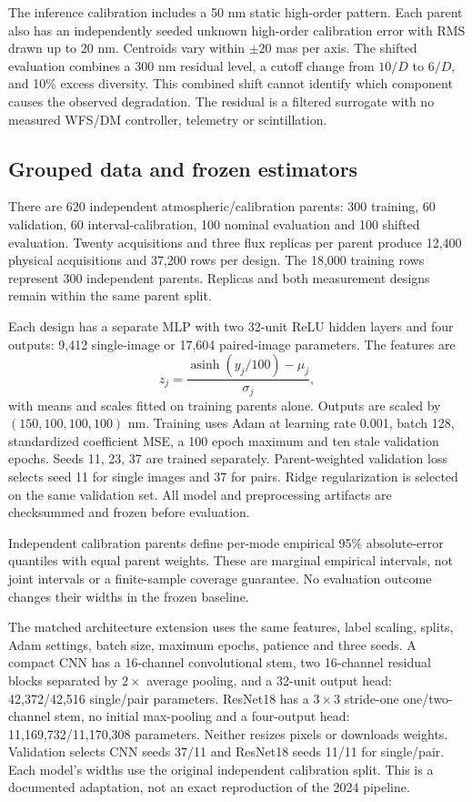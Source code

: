\documentclass[11pt,a4paper]{article}
\begin{document}
The inference calibration includes a 50 nm static high-order pattern. Each parent
also has an independently seeded unknown high-order calibration error with RMS
drawn up to 20 nm. Centroids vary within $\pm20$ mas per axis. The shifted evaluation
combines a 300 nm residual level, a cutoff change from $10/D$ to $6/D$, and 10\% excess
diversity. This combined shift cannot identify which component causes the
observed degradation. The residual is a filtered surrogate with no measured
WFS/DM controller, telemetry or scintillation.

\subsection{Grouped data and frozen estimators}
There are 620 independent atmospheric/calibration parents: 300 training,
60 validation, 60 interval-calibration, 100 nominal evaluation and 100 shifted
evaluation. Twenty acquisitions and three flux replicas per parent produce
12,400 physical acquisitions and 37,200 rows per design. The 18,000 training rows
represent 300 independent parents. Replicas and both measurement designs remain
within the same parent split.

Each design has a separate MLP with two 32-unit ReLU hidden layers and four
outputs: 9,412 single-image or 17,604 paired-image parameters. The features are
\begin{equation}
 z_j=\frac{\operatorname{asinh}(y_j/100)-\mu_j}{\sigma_j},
\end{equation}
with means and scales fitted on training parents alone. Outputs are scaled by
$(150,100,100,100)$ nm. Training uses Adam \cite{adam} at learning rate 0.001,
batch 128, standardized coefficient MSE, a 100 epoch maximum and ten stale
validation epochs. Seeds 11, 23, 37 are trained separately. Parent-weighted
validation loss selects seed 11 for single images and 37 for pairs. Ridge
regularization is selected on the same validation set. All model and
preprocessing artifacts are checksummed and frozen before evaluation.

Independent calibration parents define per-mode empirical 95\% absolute-error
quantiles with equal parent weights. These are marginal empirical intervals,
not joint intervals or a finite-sample coverage guarantee. No evaluation
outcome changes their widths in the frozen baseline.

The matched architecture extension uses the same features, label scaling,
splits, Adam settings, batch size, maximum epochs, patience and three seeds.
A compact CNN has a 16-channel convolutional stem, two 16-channel residual
blocks separated by $2\times$ average pooling, and a 32-unit output head:
42,372/42,516 single/pair parameters. ResNet18 has a $3\times3$ stride-one
one/two-channel stem, no initial max-pooling and a four-output head:
11,169,732/11,170,308 parameters. Neither resizes pixels or downloads weights.
Validation selects CNN seeds 37/11 and ResNet18 seeds 11/11 for single/pair.
Each model's widths use the original independent calibration split.
This is a documented adaptation, not an exact reproduction of the 2024 pipeline.
\end{document}
